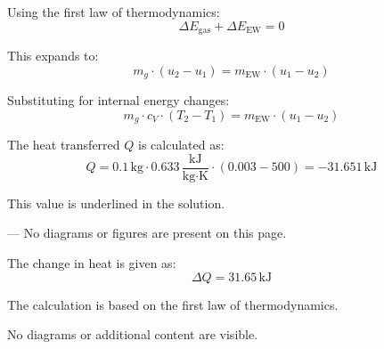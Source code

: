 Using the first law of thermodynamics:  
\[
\Delta E_{\text{gas}} + \Delta E_{\text{EW}} = 0
\]  

This expands to:  
\[
m_g \cdot (u_2 - u_1) = m_{\text{EW}} \cdot (u_1 - u_2)
\]  

Substituting for internal energy changes:  
\[
m_g \cdot c_V \cdot (T_2 - T_1) = m_{\text{EW}} \cdot (u_1 - u_2)
\]  

The heat transferred \( Q \) is calculated as:  
\[
Q = 0.1 \, \text{kg} \cdot 0.633 \, \frac{\text{kJ}}{\text{kg·K}} \cdot (0.003 - 500) = -31.651 \, \text{kJ}
\]  

This value is underlined in the solution.  

---  
No diagrams or figures are present on this page.

The change in heat is given as:  
\[
\Delta Q = 31.65 \, \text{kJ}
\]  

The calculation is based on the first law of thermodynamics.  

No diagrams or additional content are visible.